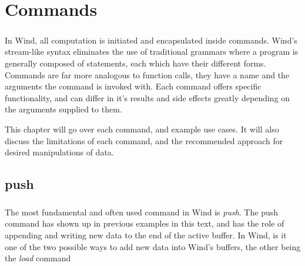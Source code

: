 
\chapter{Commands}

\paragraph{  } In Wind, all computation is initiated and encapsulated inside commands. Wind's stream-like syntax eliminates the use of traditional grammars where a program is generally composed of statements, each which have their different forms. Commands are far more analogous to function calls, they have a name and the arguments the command is invoked with. Each command offers specific functionality, and can differ in it's results and side effects greatly depending on the arguments supplied to them. 
\par This chapter will go over each command, and example use cases. It will also discuss the limitations of each command, and the recommended approach for desired manipulations of data.

\section{push}

\paragraph{  } The most fundamental and often used command in Wind is \emph{push}. The push command has shown up in previous examples in this text, and has the role of appending and writing new data to the end of the active buffer. In Wind, is it one of the two possible ways to add new data into Wind's buffers, the other being the \emph{load} command